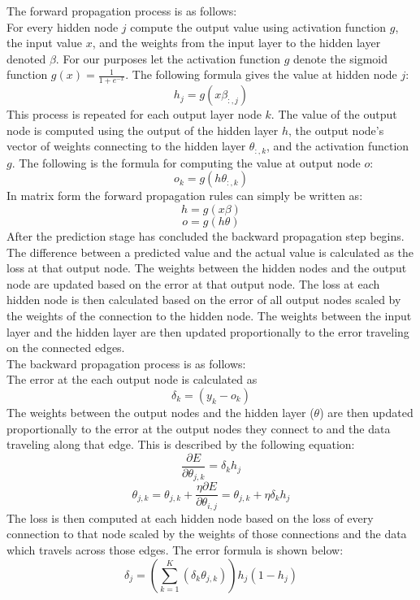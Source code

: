 \documentclass[12pt]{article}
\begin{document}
The forward propagation process is as follows:\\
For every hidden node $j$ compute the output value using activation function $g$, the input value $x$, and the weights from the input layer to the hidden layer denoted $\beta$. For our purposes let the activation function $g$ denote the sigmoid function $g(x) = \frac{1}{1 + e^{-x}}$. The following formula gives the value at hidden node $j$:\\
$$h_j = g(x\beta_{:,j})$$
This process is repeated for each output layer node $k$. The value of the output node is computed using the output of the hidden layer $h$, the output node's vector of weights connecting to the hidden layer $\theta_{:,k}$, and the activation function $g$. The following is the formula for computing the value at output node $o$:\\
$$o_k = g(h\theta_{:,k})$$
In matrix form the forward propagation rules can simply be written as:\\
$$h = g(x\beta)$$
$$o = g(h\theta)$$
After the prediction stage has concluded the backward propagation step begins. The difference between a predicted value and the actual value is calculated as the loss at that output node. The weights between the hidden nodes and the output node are updated based on the error at that output node. The loss at each hidden node is then calculated based on the error of all output nodes scaled by the weights of the connection to the hidden node. The weights between the input layer and the hidden layer are then updated proportionally to the error traveling on the connected edges.\\
The backward propagation process is as follows:\\
The error at the each output node is calculated as
$$\delta_k = (y_k - o_k)$$
The weights between the output nodes and the hidden layer ($\theta$) are then updated proportionally to the error at the output nodes they connect to and the data traveling along that edge. This is described by the following equation:\\
$$\frac{\partial E}{\partial \theta_{j,k}} = \delta_k h_j$$
$$\theta_{j,k} = \theta_{j,k} + \frac{\eta \partial E}{\partial \theta_{i,j}} = \theta_{j,k} + \eta \delta_k h_j$$
The loss is then computed at each hidden node based on the loss of every connection to that node scaled by the weights of those connections and the data which travels across those edges. The error formula is shown below:\\
$$\delta_j = (\sum_{k=1}^{K}(\delta_k \theta_{j,k}))h_j(1-h_j)$$
\end{document}
